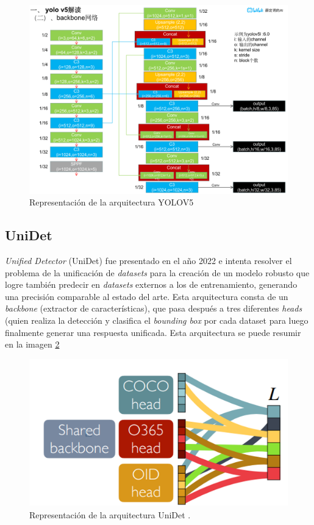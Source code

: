\begin{figure}[h!]
\includegraphics[width=1\textwidth]{images/yolov5.png}
\centering
\caption{Representación de la arquitectura YOLOV5 \protect\cite{yolov5}}
\label{YOLO}
\end{figure}

\subsection{UniDet}

\textit{Unified Detector} (UniDet) fue presentado en el año 2022 e intenta resolver 
el problema de la unificación de \textit{datasets} para la creación de un modelo 
robusto que logre también predecir en \textit{datasets} externos a los de entrenamiento, 
generando una precisión comparable al estado del arte. Esta arquitectura consta de un 
\textit{backbone} (extractor de características), que pasa después a tres diferentes 
\textit{heads} (quien realiza la detección y clasifica el \textit{bounding box} por cada 
dataset para luego finalmente generar una respuesta unificada. Esta arquitectura se puede 
resumir en la imagen \ref{fig:unidet}

\begin{figure}[h!]
\includegraphics[width=1\textwidth]{images/imagenUnidet.png}
\centering
\caption{Representación de la arquitectura UniDet \protect\cite{unidet}.}
\label{fig:unidet}
\end{figure}

